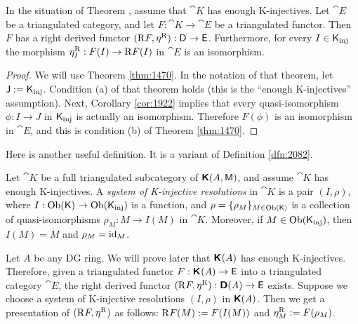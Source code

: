 \begin{thm}  \label{thm:5050}   
In the situation of Theorem \tup{\ref{thm:3135}}, assume that $\cat{K}$ has 
enough K-injectives. Let $\cat{E}$ be a triangulated category, and let 
$F : \cat{K} \to \cat{E}$
be a triangulated functor. Then $F$ has a right derived functor 
$(\mathrm{R} F, \eta^{\mathrm{R}}) : \operatorname{\mathsf{D}} \to \operatorname{\mathsf{E}}$. 
Furthermore, for every $I \in \operatorname{\mathsf{K}}_{\mathrm{inj}}$ the morphism 
$\eta^{\mathrm{R}}_I : F(I) \to \mathrm{R} F(I)$
in $\cat{E}$ is an isomorphism. 
\end{thm}

\begin{proof}
We will use Theorem \ref{thm:1470}. In the notation of that theorem, let 
$\operatorname{\mathsf{J}} := \operatorname{\mathsf{K}}_{\mathrm{inj}}$.
Condition (a) of that theorem holds (this is the ``enough K-injectives'' 
assumption). Next, Corollary \ref{cor:1922} implies that every 
quasi-isomorphism $\phi : I \to J$ in $\operatorname{\mathsf{K}}_{\mathrm{inj}}$ is actually an 
isomorphism. Therefore $F(\phi)$ is an isomorphism in $\cat{E}$, and this is 
condition (b) of  Theorem \ref{thm:1470}. 
\end{proof}

Here is another useful definition. It is a variant of Definition \ref{dfn:2082}.

\begin{dfn} \label{dfn:1512}
Let $\cat{K}$ be a full triangulated subcategory of 
$\boldsymbol{\mathsf{K}}(A, \operatorname{\mathsf{M}})$, and assume $\cat{K}$ has enough K-injectives.
A  {\em system of K-injective resolutions} in $\cat{K}$ is a pair $(I, \rho)$, 
where $I : \operatorname{Ob}(\operatorname{\mathsf{K}}) \to \operatorname{Ob}(\operatorname{\mathsf{K}}_{\mathrm{inj}})$
is a function, and 
$\rho = \{ \rho_M \}_{M \in \operatorname{Ob}(\operatorname{\mathsf{K}})}$ 
is a collection of quasi-isomorphisms
$\rho_M : M \to I(M)$ in $\cat{K}$.
Moreover, if $M \in \operatorname{Ob}(\operatorname{\mathsf{K}}_{\mathrm{inj}})$, then 
$I(M) = M$ and $\rho_M = \operatorname{id}_M$. 
\end{dfn}

\begin{exa} \label{exa:1530}
Let $A$ be any DG ring. We will prove later that 
$\boldsymbol{\mathsf{K}}^{}(A)$ has enough K-injectives. Therefore, given a triangulated 
functor $F : \boldsymbol{\mathsf{K}}^{}(A) \to \operatorname{\mathsf{E}}$ into a triangulated category 
$\cat{E}$, the right derived functor  
$(\mathrm{R} F, \eta^{\mathrm{R}}) : \boldsymbol{\mathsf{D}}(A) \to \operatorname{\mathsf{E}}$ 
exists. Suppose we choose a system  of K-injective resolutions $(I, \rho)$ in 
$\boldsymbol{\mathsf{K}}(A)$. Then we get a presentation of $(\mathrm{R} F, \eta^{\mathrm{R}})$ as 
follows: $\mathrm{R} F(M) := F(I(M))$ and $\eta^{\mathrm{R}}_M := F(\rho_M)$. 
\end{exa}

